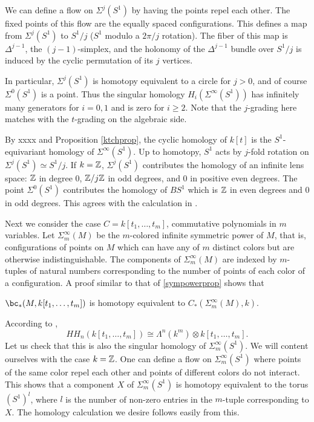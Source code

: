 We can define a flow on $\Sigma^j(S^1)$ by having the points repel each other.
The fixed points of this flow are the equally spaced configurations.
This defines a map from $\Sigma^j(S^1)$ to $S^1/j$ ($S^1$ modulo a $2\pi/j$ rotation).
The fiber of this map is $\Delta^{j-1}$, the $(j-1)$-simplex, 
and the holonomy of the $\Delta^{j-1}$ bundle
over $S^1/j$ is induced by the cyclic permutation of its $j$ vertices.

In particular, $\Sigma^j(S^1)$ is homotopy equivalent to a circle for $j>0$, and
of course $\Sigma^0(S^1)$ is a point.
Thus the singular homology $H_i(\Sigma^\infty(S^1))$ has infinitely many generators for $i=0,1$
and is zero for $i\ge 2$.
Note that the $j$-grading here matches with the $t$-grading on the algebraic side.

By xxxx and Proposition \ref{ktchprop}, 
the cyclic homology of $k[t]$ is the $S^1$-equivariant homology of $\Sigma^\infty(S^1)$.
Up to homotopy, $S^1$ acts by $j$-fold rotation on $\Sigma^j(S^1) \simeq S^1/j$.
If $k = \mathbb{Z}$, $\Sigma^j(S^1)$ contributes the homology of an infinite lens space: $\mathbb{Z}$ in degree
0, $\mathbb{Z}/j \mathbb{Z}$ in odd degrees, and 0 in positive even degrees.
The point $\Sigma^0(S^1)$ contributes the homology of $BS^1$ which is $\mathbb{Z}$ in even 
degrees and 0 in odd degrees.
This agrees with the calculation in \cite[3.1.7]{MR1600246}.

\medskip

Next we consider the case $C = k[t_1, \ldots, t_m]$, commutative polynomials in $m$ variables.
Let $\Sigma_m^\infty(M)$ be the $m$-colored infinite symmetric power of $M$, that is, configurations
of points on $M$ which can have any of $m$ distinct colors but are otherwise indistinguishable.
The components of $\Sigma_m^\infty(M)$ are indexed by $m$-tuples of natural numbers
corresponding to the number of points of each color of a configuration.
A proof similar to that of \ref{sympowerprop} shows that

\begin{prop}
$\bc_*(M, k[t_1, \ldots, t_m])$ is homotopy equivalent to $C_*(\Sigma_m^\infty(M), k)$.
\end{prop}

According to \cite[3.2.2]{MR1600246},
\[
	HH_n(k[t_1, \ldots, t_m]) \cong \Lambda^n(k^m) \otimes k[t_1, \ldots, t_m] .
\]
Let us check that this is also the singular homology of $\Sigma_m^\infty(S^1)$.
We will content ourselves with the case $k = \mathbb{Z}$.
One can define a flow on $\Sigma_m^\infty(S^1)$ where points of the 
same color repel each other and points of different colors do not interact.
This shows that a component $X$ of $\Sigma_m^\infty(S^1)$ is homotopy equivalent
to the torus $(S^1)^l$, where $l$ is the number of non-zero entries in the $m$-tuple
corresponding to $X$.
The homology calculation we desire follows easily from this.

